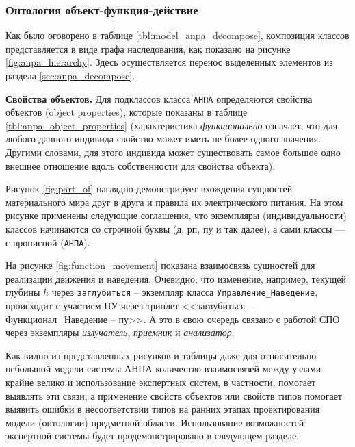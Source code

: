 \subsubsection{Онтология объект-функция-действие}
Как было оговорено в таблице \ref{tbl:model_anpa_decompose}, композиция классов представляется в виде графа наследования,
как показано на рисунке \ref{fig:anpa_hierarchy}. Здесь осуществляется перенос выделенных элементов из раздела \ref{sec:anpa_decompose}.

\textbf{Свойства объектов.}
Для подклассов класса \texttt{АНПА} определяются свойства объектов (object properties), которые показаны в таблице \ref{tbl:anpa_object_properties}
(характеристика \textit{функционально} означает, что для любого данного индивида свойство может иметь не более одного значения. 
Другими словами, для этого индивида может существовать самое большое одно внешнее отношение вдоль собственности для свойства объекта).
%

Рисунок \ref{fig:part_of} наглядно демонстрирует вхождения сущностей материального мира друг в друга и правила их электрического питания.
На этом рисунке применены следующие соглашения, что экземпляры (индивидуальности) классов начинаются со строчной буквы (д, рп, пу и так далее),
а сами классы --- с прописной (\texttt{АНПА}).

На рисунке \ref{fig:function_movement} показана взаимосвязь сущностей для реализации движения и наведения.
Очевидно, что изменение, например, текущей глубины $h$ через \texttt{заглубиться} -- экземпляр класса \texttt{Управление\_Наведение},
происходит с участием ПУ через триплет <<заглубиться -- Функционал\_Наведение -- пу>>.
А это в свою очередь связано с работой СПО через экземпляры \textit{излучатель}, \textit{приемник} и \textit{анализатор}.

Как видно из представленных рисунков и таблицы даже для относительно небольшой модели системы АНПА количество взаимосвязей между узлами
крайне велико и использование экспертных систем, в частности, \protege помогает выявлять эти связи,
а применение свойств объектов или свойств типов помогает выявить ошибки в несоответствии типов на ранних этапах проектирования модели (онтологии)
предметной области. Использование возможностей экспертной системы будет продемонстрировано в следующем разделе.


